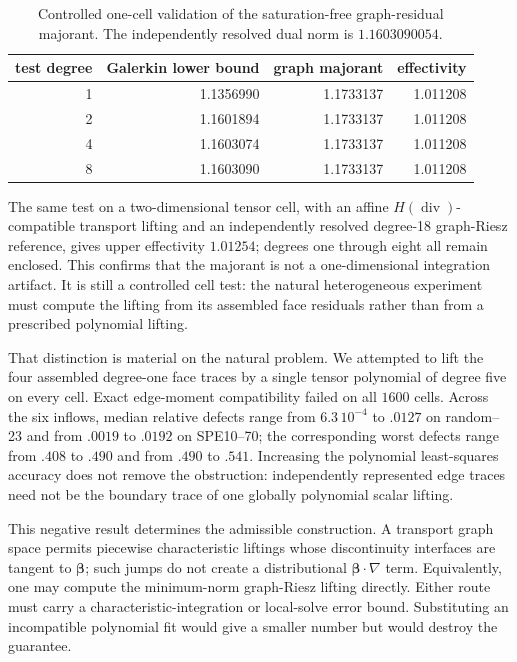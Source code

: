 \documentclass[11pt]{article}
\numberwithin{algorithm}{section}
\theoremstyle{definition}\newtheorem{definition}[theorem]{Definition}
\theoremstyle{remark}\newtheorem{remark}[theorem]{Remark}
\begin{document}
\begin{table}[t]
\centering
\caption{Controlled one-cell validation of the saturation-free
graph-residual majorant.  The independently resolved dual norm is
$1.1603090054$.}
\label{tab:graph-majorant-validation}
\begin{tabular}{rrrr}
\toprule
test degree & Galerkin lower bound & graph majorant & effectivity\\
\midrule
1 & 1.1356990 & 1.1733137 & 1.011208\\
2 & 1.1601894 & 1.1733137 & 1.011208\\
4 & 1.1603074 & 1.1733137 & 1.011208\\
8 & 1.1603090 & 1.1733137 & 1.011208\\
\bottomrule
\end{tabular}
\end{table}

The same test on a two-dimensional tensor cell, with an affine
$H(\operatorname{div})$-compatible transport lifting and an independently
resolved degree-18 graph-Riesz reference, gives upper effectivity $1.01254$;
degrees one through eight all remain enclosed.  This confirms that the
majorant is not a one-dimensional integration artifact.  It is still a
controlled cell test: the natural heterogeneous experiment must compute the
lifting from its assembled face residuals rather than from a prescribed
polynomial lifting.

That distinction is material on the natural problem.  We attempted to lift
the four assembled degree-one face traces by a single tensor polynomial of
degree five on every cell.  Exact edge-moment compatibility failed on all
$1600$ cells.  Across the six inflows, median relative defects range from
$6.3\,10^{-4}$ to $.0127$ on random--23 and from $.0019$ to $.0192$ on
SPE10--70; the corresponding worst defects range from $.408$ to $.490$ and
from $.490$ to $.541$.  Increasing the polynomial least-squares accuracy does
not remove the obstruction: independently represented edge traces need not be
the boundary trace of one globally polynomial scalar lifting.

This negative result determines the admissible construction.  A transport
graph space permits piecewise characteristic liftings whose discontinuity
interfaces are tangent to $\boldsymbol\beta$; such jumps do not create a
distributional $\boldsymbol\beta\cdot\nabla$ term.  Equivalently, one may
compute the minimum-norm graph-Riesz lifting directly.  Either route must
carry a characteristic-integration or local-solve error bound.  Substituting
an incompatible polynomial fit would give a smaller number but would destroy
the guarantee.
\end{document}
